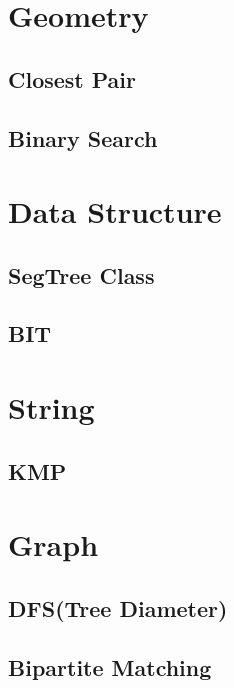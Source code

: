 \documentclass[10pt,landscape,a4paper,twocolumn]{article}
\begin{document}
\tableofcontents


\section{Geometry}
\subsection{Closest Pair}


\subsection{Binary Search}


\section{Data Structure}

\subsection{SegTree Class}


\subsection{BIT}


\section{String}
\subsection{KMP}


\section{Graph}
\subsection{DFS(Tree Diameter)}


\subsection{Bipartite Matching}

\end{document}
